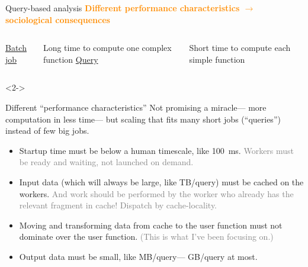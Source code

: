 \documentclass[aspectratio=169]{beamer}
\begin{document}
\begin{frame}{Query-based analysis}
\large
\vspace{0.5 cm}
\textcolor{darkorange}{\bf Different performance characteristics $\to$ sociological consequences}

\vspace{1 cm}
\begin{columns}
\underline{\Large Batch job}

\vspace{0.2 cm}
Long time to compute one complex function
\underline{\Large Query}

\vspace{0.2 cm}
Short time to compute each simple function
\end{columns}

\vspace{1 cm}
\begin{uncoverenv}<2->
 \hfill {}
\end{uncoverenv}
\end{frame}

\begin{frame}{Different ``performance characteristics''}
\large
\vspace{0.5 cm}
Not promising a miracle--- more computation in less time--- but scaling that fits many short jobs (``queries'') instead of few big jobs.

\vspace{0.5 cm}

\vspace{0.2 cm}
\begin{itemize}
\item<3-> Startup time must be below a human timescale, like 100~ms. \textcolor{gray}{Workers must be ready and waiting, not launched on demand.}
\item<4-> Input data (which will always be large, like TB/query) must be cached on the workers. \textcolor{gray}{And work should be performed by the worker who already has the relevant fragment in cache! Dispatch by cache-locality.}
\item<5-> Moving and transforming data from cache to the user function must not dominate over the user function. \textcolor{gray}{(This is what I've been focusing on.)}
\item<6-> Output data must be small, like MB/query--- GB/query at most.
\end{itemize}
\end{frame}
\end{document}
